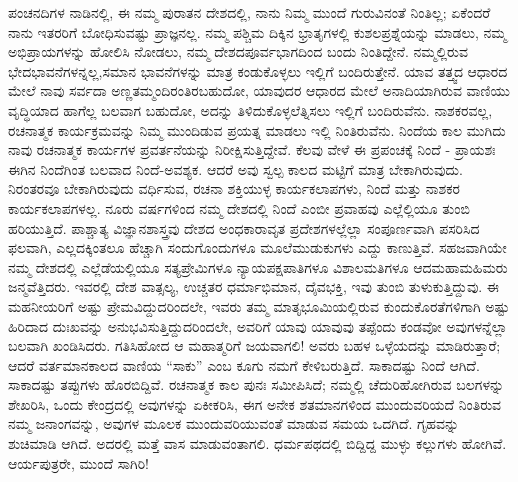 ಪಂಚನದಿಗಳ ನಾಡಿನಲ್ಲಿ, ಈ ನಮ್ಮ ಪುರಾತನ ದೇಶದಲ್ಲಿ, ನಾನು ನಿಮ್ಮ ಮುಂದೆ ಗುರುವಿನಂತೆ ನಿಂತಿಲ್ಲ; ಏಕೆಂದರೆ ನಾನು ಇತರರಿಗೆ ಬೋಧಿಸುವಷ್ಟು ಪ್ರಾಜ್ಞನಲ್ಲ. ನಮ್ಮ ಪಶ್ಚಿಮ ದಿಕ್ಕಿನ ಭ್ರಾತೃಗಳಲ್ಲಿ ಕುಶಲಪ್ರಶ್ನೆಯನ್ನು ಮಾಡಲು, ನಮ್ಮ ಅಭಿಪ್ರಾಯಗಳನ್ನು ಹೋಲಿಸಿ ನೋಡಲು, ನಮ್ಮ ದೇಶದ\break ಪೂರ್ವಭಾಗದಿಂದ ಬಂದು ನಿಂತಿದ್ದೇನೆ. ನಮ್ಮಲ್ಲಿರುವ ಭೇದಭಾವನೆಗಳನ್ನಲ್ಲ,\break ಸಮಾನ ಭಾವನೆಗಳನ್ನು ಮಾತ್ರ ಕಂಡುಕೊಳ್ಳಲು ಇಲ್ಲಿಗೆ ಬಂದಿರುತ್ತೇನೆ. ಯಾವ ತತ್ತ್ವದ ಆಧಾರದ ಮೇಲೆ ನಾವು ಸರ್ವದಾ ಅಣ್ಣತಮ್ಮಂದಿರಂತಿರಬಹುದೋ, ಯಾವುದರ ಆಧಾರದ ಮೇಲೆ ಅನಾದಿಯಾಗಿರುವ ವಾಣಿಯು ವೃದ್ಧಿಯಾದ ಹಾಗೆಲ್ಲ ಬಲವಾಗ ಬಹುದೋ, ಅದನ್ನು ತಿಳಿದುಕೊಳ್ಳಲೆತ್ನಿಸಲು ಇಲ್ಲಿಗೆ ಬಂದಿರುವೆನು. ನಾಶಕರವಲ್ಲ, ರಚನಾತ್ಮಕ ಕಾರ್ಯಕ್ರಮವನ್ನು ನಿಮ್ಮ ಮುಂದಿಡುವ ಪ್ರಯತ್ನ ಮಾಡಲು ಇಲ್ಲಿ ನಿಂತಿರುವೆನು. ನಿಂದೆಯ ಕಾಲ ಮುಗಿದು ನಾವು ರಚನಾತ್ಮಕ ಕಾರ್ಯಗಳ ಪ್ರವರ್ತನೆಯನ್ನು ನಿರೀಕ್ಷಿಸುತ್ತಿದ್ದೇವೆ. ಕೆಲವು ವೇಳೆ ಈ ಪ್ರಪಂಚಕ್ಕೆ ನಿಂದೆ - ಪ್ರಾಯಶಃ ಈಗಿನ ನಿಂದೆಗಿಂತ ಬಲವಾದ ನಿಂದೆ-ಅವಶ್ಯಕ. ಆದರೆ ಅವು ಸ್ವಲ್ಪ ಕಾಲದ ಮಟ್ಟಿಗೆ ಮಾತ್ರ ಬೇಕಾಗಿರುವುದು. ನಿರಂತರವೂ ಬೇಕಾಗಿರುವುದು ವರ್ಧಿಸುವ, ರಚನಾ ಶಕ್ತಿಯುಳ್ಳ ಕಾರ್ಯಕಲಾಪಗಳು, ನಿಂದೆ ಮತ್ತು ನಾಶಕರ ಕಾರ್ಯಕಲಾಪಗಳಲ್ಲ. ನೂರು ವರ್ಷಗಳಿಂದ ನಮ್ಮ ದೇಶದಲ್ಲಿ ನಿಂದೆ ಎಂಬೀ ಪ್ರವಾಹವು ಎಲ್ಲೆಲ್ಲಿಯೂ ತುಂಬಿ ಹರಿಯುತ್ತಿದೆ. ಪಾಶ್ಚಾತ್ಯ ವಿಜ್ಞಾನಶಾಸ್ತ್ರವು ದೇಶದ ಅಂಧಕಾರಾವೃತ ಪ್ರದೇಶಗಳಲ್ಲೆಲ್ಲಾ ಸಂಪೂರ್ಣವಾಗಿ ಪಸರಿಸಿದ ಫಲವಾಗಿ, ಎಲ್ಲದಕ್ಕಿಂತಲೂ ಹೆಚ್ಚಾಗಿ ಸಂದುಗೊಂದುಗಳೂ ಮೂಲೆಮುಡುಕುಗಳು ಎದ್ದು ಕಾಣುತ್ತಿವೆ. ಸಹಜವಾಗಿಯೇ ನಮ್ಮ ದೇಶದಲ್ಲಿ ಎಲ್ಲೆಡೆಯಲ್ಲಿಯೂ ಸತ್ಯಪ್ರೇಮಿಗಳೂ ನ್ಯಾಯಪಕ್ಷಪಾತಿಗಳೂ ವಿಶಾಲಮತಿಗಳೂ ಆದ\break ಮಹಾಮಹಿಮರು ಜನ್ಮವೆತ್ತಿದರು. ಇವರಲ್ಲಿ ದೇಶ ವಾತ್ಸಲ್ಯ, ಉಚ್ಚತರ ಧರ್ಮಾಭಿ\-ಮಾನ, ದೈವಭಕ್ತಿ, ಇವು ತುಂಬಿ ತುಳುಕುತ್ತಿದ್ದುವು. ಈ ಮಹನೀಯರಿಗೆ ಅಷ್ಟು ಪ್ರೇಮವಿದ್ದುದರಿಂದಲೇ, ಇವರು ತಮ್ಮ ಮಾತೃಭೂಮಿಯಲ್ಲಿರುವ ಕುಂದುಕೊರತೆಗಳಿಗಾಗಿ ಅಷ್ಟು ಹಿರಿದಾದ ದುಃಖವನ್ನು ಅನುಭವಿಸುತ್ತಿದ್ದುದರಿಂದಲೇ, ಅವರಿಗೆ ಯಾವು ಯಾವುವು ತಪ್ಪೆಂದು ಕಂಡವೋ ಅವುಗಳನ್ನೆಲ್ಲಾ ಬಲವಾಗಿ ಖಂಡಿಸಿದರು. ಗತಿಸಿಹೋದ ಆ ಮಹಾತ್ಮರಿಗೆ ಜಯವಾಗಲಿ! ಅವರು ಬಹಳ ಒಳ್ಳೆಯದನ್ನು ಮಾಡಿರುತ್ತಾರೆ; ಆದರೆ ವರ್ತಮಾನಕಾಲದ ವಾಣಿಯ “ಸಾಕು” ಎಂಬ ಕೂಗು ನಮಗೆ ಕೇಳಿಬರುತ್ತಿದೆ. ಸಾಕಾದಷ್ಟು ನಿಂದೆ ಆಗಿದೆ. ಸಾಕಾದಷ್ಟು ತಪ್ಪುಗಳು ಹೊರಬಿದ್ದಿವೆ. ರಚನಾತ್ಮಕ ಕಾಲ ಪುನಃ ಸಮೀಪಿಸಿದೆ; ನಮ್ಮಲ್ಲಿ ಚೆದುರಿಹೋಗಿರುವ ಬಲಗಳನ್ನು ಶೇಖರಿಸಿ, ಒಂದು ಕೇಂದ್ರದಲ್ಲಿ ಅವುಗಳನ್ನು ಏಕೀಕರಿಸಿ, ಈಗ ಅನೇಕ ಶತಮಾನಗಳಿಂದ ಮುಂದುವರಿಯದೆ ನಿಂತಿರುವ ನಮ್ಮ ಜನಾಂಗವನ್ನು, ಅವುಗಳ ಮೂಲಕ ಮುಂದುವರಿಯುವಂತೆ ಮಾಡುವ ಸಮಯ ಒದಗಿದೆ. ಗೃಹವನ್ನು ಶುಚಿಮಾಡಿ ಆಗಿದೆ. ಅದರಲ್ಲಿ ಮತ್ತೆ ವಾಸ ಮಾಡುವಂತಾಗಲಿ. ಧರ್ಮಪಥದಲ್ಲಿ ಬಿದ್ದಿದ್ದ ಮುಳ್ಳು ಕಲ್ಲುಗಳು ಹೋಗಿವೆ. ಆರ್ಯಪುತ್ರರೇ, ಮುಂದೆ ಸಾಗಿರಿ!

